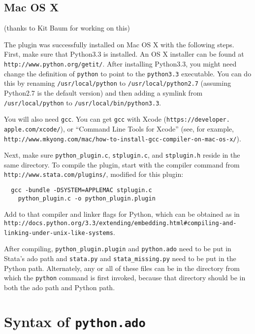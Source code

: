 \documentclass{article}
\begin{document}
	
\subsection{Mac OS X}

{\small (thanks to Kit Baum for working on this)}\newline

The plugin was successfully installed on Mac OS X with the following steps. First, make sure that Python3.3 is installed. An OS X installer can be found at \lstinline{http://www.python.org/getit/}. After installing Python3.3, you might need change the definition of \lstinline{python} to point to the \lstinline{python3.3} executable. You can do this by renaming \lstinline{/usr/local/python} to \lstinline{/usr/local/python2.7} (assuming Python2.7 is the default version) and then adding a symlink from \lstinline{/usr/local/python} to \lstinline{/usr/local/bin/python3.3}.

You will also need \lstinline{gcc}. You can get \lstinline{gcc} with Xcode (\lstinline{https://developer.} \lstinline{apple.com/xcode/}), or ``Command Line Tools for Xcode'' (see, for example, \lstinline{http://www.mkyong.com/mac/how-to-install-gcc-compiler-on-mac-os-x/}).

Next, make sure \lstinline{python_plugin.c}, \lstinline{stplugin.c}, and \lstinline{stplugin.h} reside in the same directory. To compile the plugin, start with the compiler command from \lstinline{http://www.stata.com/plugins/}, modified for this plugin:
\begin{lstlisting}
  gcc -bundle -DSYSTEM=APPLEMAC stplugin.c 
    python_plugin.c -o python_plugin.plugin
\end{lstlisting}
Add to that compiler and linker flags for Python, which can be obtained as in \newline
\lstinline{http://docs.python.org/3.3/extending/embedding.html#compiling-and-} \newline \lstinline{linking-under-unix-like-systems}.

After compiling, \lstinline{python_plugin.plugin} and \lstinline{python.ado} need to be put in Stata's ado path and \lstinline{stata.py} and \lstinline{stata_missing.py} need to be put in the Python path. Alternately, any or all of these files can be in the directory from which the \lstinline{python} command is first invoked, because that directory should be in both the ado path and Python path.


\section{Syntax of \lstinline$python.ado$} \label{syntax}
\end{document}
